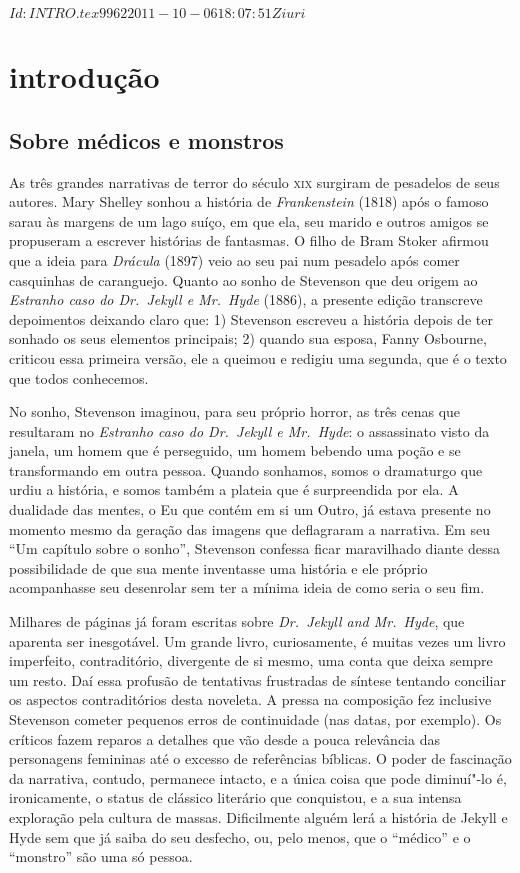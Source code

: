 \SVN $Id: INTRO.tex 9962 2011-10-06 18:07:51Z iuri $
\chapter[Introdução, por Braulio Tavares]{introdução}

\section{Sobre médicos e monstros}

As três grandes narrativas de terror do século \textsc{xix} surgiram de
pesadelos de seus autores.  Mary Shelley sonhou a história de
\textit{Frankenstein} (1818) após o famoso sarau às margens de um lago
suíço, em que ela, seu marido e outros amigos se propuseram a escrever
histórias de fantasmas.  O filho de Bram Stoker afirmou que a ideia
para \textit{Drácula} (1897) veio ao seu pai num pesadelo após comer
casquinhas de caranguejo.  Quanto ao sonho de Stevenson que deu origem
ao \textit{Estranho caso do Dr.~Jekyll e Mr.~Hyde} (1886), a presente
edição transcreve depoimentos deixando claro que: 1) Stevenson escreveu
a história depois de ter sonhado os seus elementos principais; 2)
quando sua esposa, Fanny Osbourne, criticou essa primeira versão, ele a       
queimou e redigiu uma segunda, que é o texto que todos conhecemos.

No sonho, Stevenson imaginou, para seu próprio horror, as três cenas que
resultaram no \textit{Estranho caso do Dr.~Jekyll e Mr.~Hyde}: o
assassinato visto da janela, um homem que é perseguido, um homem
bebendo uma poção e se transformando em outra pessoa. Quando sonhamos,
somos o dramaturgo que urdiu a história, e somos também a plateia que é
surpreendida por ela.  A dualidade das mentes, o Eu que contém em si um
Outro, já estava presente no momento mesmo da geração das imagens que
deflagraram a narrativa.  Em seu “Um capítulo sobre o sonho”, Stevenson
confessa ficar maravilhado diante dessa possibilidade de que sua mente
inventasse uma história e ele próprio acompanhasse seu desenrolar sem
ter a mínima ideia de como seria o seu fim.
\pagebreak
\pagebreak

Milhares de páginas já foram escritas sobre \textit{Dr.~Jekyll and Mr.~Hyde}, 
que aparenta ser inesgotável. Um grande livro, curiosamente, é muitas 
vezes um livro imperfeito, contraditório, divergente de si mesmo, uma 
conta que deixa sempre um resto.  Daí essa profusão de tentativas frustradas 
de síntese tentando conciliar os aspectos contraditórios desta noveleta.  
A pressa na composição fez inclusive Stevenson cometer pequenos erros de 
continuidade (nas datas, por exemplo). Os críticos fazem reparos a detalhes 
que vão desde a pouca relevância das personagens femininas até o excesso de 
referências bíblicas.  O poder de fascinação da narrativa, contudo, permanece 
intacto, e a única coisa que pode diminuí"-lo é, ironicamente, o status de clássico 
literário que conquistou, e a sua intensa exploração pela cultura de massas. 
Dificilmente alguém lerá a história de Jekyll e Hyde sem que já saiba do seu desfecho, 
ou, pelo menos, que o “médico” e o “monstro” são uma só pessoa.


